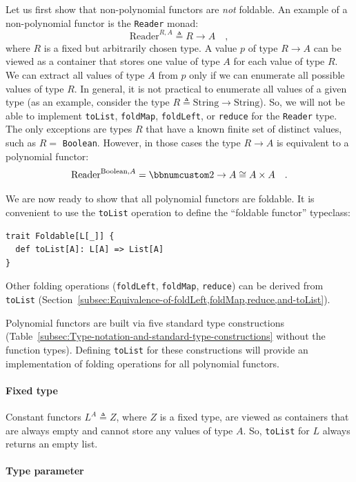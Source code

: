 Let us first show that non-polynomial functors are \emph{not} foldable.
An example of a non-polynomial functor is the \lstinline!Reader!
monad:
\[
\text{Reader}^{R,A}\triangleq R\rightarrow A\quad,
\]
where $R$ is a fixed but arbitrarily chosen type. A value $p$ of
type $R\rightarrow A$ can be viewed as a container that stores one
value of type $A$ for each value of type $R$. We can extract all
values of type $A$ from $p$ only if we can enumerate all possible
values of type $R$. In general, it is not practical to enumerate
all values of a given type (as an example, consider the type $R\triangleq\text{String}\rightarrow\text{String}$).
So, we will not be able to implement \lstinline!toList!, \lstinline!foldMap!,
\lstinline!foldLeft!, or \lstinline!reduce! for the \lstinline!Reader!
type. The only exceptions are types $R$ that have a known finite
set of distinct values, such as $R=$ \lstinline!Boolean!. However,
in those cases the type $R\rightarrow A$ is equivalent to a polynomial
functor:
\[
\text{Reader}^{\text{Boolean},A}=\bbnum 2\rightarrow A\cong A\times A\quad.
\]

We are now ready to show that all polynomial functors are foldable.
It is convenient to use the \lstinline!toList! operation to define
the \textsf{``}foldable functor\textsf{''} typeclass:
\begin{lstlisting}
trait Foldable[L[_]] {
  def toList[A]: L[A] => List[A]
}
\end{lstlisting}
Other folding operations (\lstinline!foldLeft!, \lstinline!foldMap!,
\lstinline!reduce!) can be derived from \lstinline!toList! (Section~\ref{subsec:Equivalence-of-foldLeft,foldMap,reduce,and-toList}).

Polynomial functors are built via five standard type constructions
(Table~\ref{subsec:Type-notation-and-standard-type-constructions}
without the function types). Defining \lstinline!toList! for these
constructions will provide an implementation of folding operations
for all polynomial functors.

\paragraph{Fixed type}

Constant functors $L^{A}\triangleq Z$, where $Z$ is a fixed type,
are viewed as containers that are always empty and cannot store any
values of type $A$. So, \lstinline!toList! for $L$ always returns
an empty list.

\paragraph{Type parameter}

